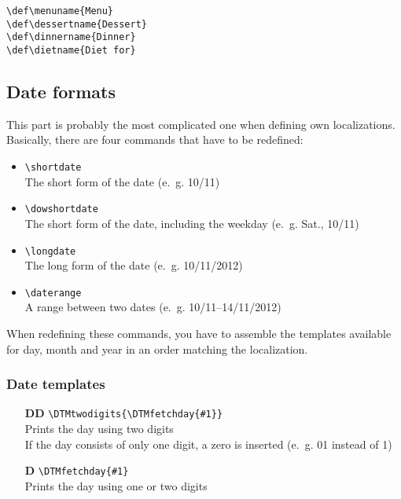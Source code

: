 \documentclass[11pt]{ltxdoc}
\begin{document}
	\medskip
	\verb|\def\menuname{Menu}| \\
	\verb|\def\dessertname{Dessert}| \\
	\verb|\def\dinnername{Dinner}| \\
	\verb|\def\dietname{Diet for}|
	
	
	\subsection{Date formats}
	This part is probably the most complicated one when defining own localizations. \\
	Basically, there are four commands that have to be redefined:
	\begin{itemize}
		\item \verb|\shortdate| \\
		The short form of the date (e.~g. 10/11)
		
		\item \verb|\dowshortdate| \\
		The short form of the date, including the weekday (e.~g. Sat., 10/11)
		
		\item \verb|\longdate| \\
		The long form of the date (e.~g. 10/11/2012)
		
		\item \verb|\daterange| \\
		A range between two dates (e.~g. 10/11--14/11/2012)
	\end{itemize}
	
	\medskip
	When redefining these commands, you have to assemble the templates available for day, month and year in an order matching the localization.
	
	\subsubsection*{Date templates}
	\begin{itemize}
		\item[\sffamily\bfseries DD]
		\verb|\DTMtwodigits{\DTMfetchday{#1}}| \\
		Prints the day using two digits \\
		If the day consists of only one digit, a zero is inserted  (e.~g. 01 instead of 1)
		
		\item[\sffamily\bfseries D]
		\verb|\DTMfetchday{#1}| \\
		Prints the day using one or two digits
	\end{itemize}
	
\end{document}
